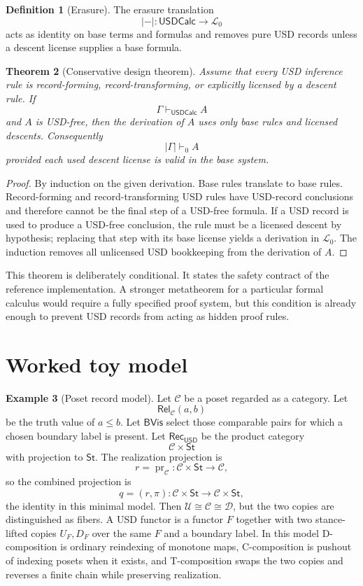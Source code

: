 \documentclass[11pt]{article}
\newcommand{\USD}{\mathsf{USD}}
\newcommand{\RecUSD}{\mathsf{Rec}_{\USD}}
\newcommand{\St}{\mathsf{St}}
\newcommand{\UFib}{\mathcal U}
\newcommand{\DFib}{\mathcal D}
\newcommand{\Rel}{\mathsf{Rel}}
\newcommand{\BVis}{\mathsf{BVis}}
\newcommand{\USDCalc}{\mathsf{USDCalc}}
\theoremstyle{definition}
\newtheorem{definition}{Definition}[section]
\newtheorem{example}[definition]{Example}
\theoremstyle{plain}
\newtheorem{theorem}[definition]{Theorem}
\begin{document}
\begin{definition}[Erasure]
The erasure translation
\[
  |-|:\USDCalc\to\mathcal L_0
\]
acts as identity on base terms and formulas and removes pure USD records
unless a descent license supplies a base formula.
\end{definition}

\begin{theorem}[Conservative design theorem]
Assume that every USD inference rule is record-forming, record-transforming,
or explicitly licensed by a descent rule.  If
\[
  \Gamma\vdash_{\USDCalc} A
\]
and $A$ is USD-free, then the derivation of $A$ uses only base rules and
licensed descents.  Consequently
\[
  |\Gamma|\vdash_0 A
\]
provided each used descent license is valid in the base system.
\end{theorem}

\begin{proof}
By induction on the given derivation.  Base rules translate to base rules.
Record-forming and record-transforming USD rules have USD-record
conclusions and therefore cannot be the final step of a USD-free formula.
If a USD record is used to produce a USD-free conclusion, the rule must be
a licensed descent by hypothesis; replacing that step with its base
license yields a derivation in $\mathcal L_0$.  The induction removes all
unlicensed USD bookkeeping from the derivation of $A$.
\end{proof}

This theorem is deliberately conditional.  It states the safety contract
of the reference implementation.  A stronger metatheorem for a particular
formal calculus would require a fully specified proof system, but this
condition is already enough to prevent USD records from acting as hidden
proof rules.

\section{Worked toy model}

\begin{example}[Poset record model]
Let $\mathcal C$ be a poset regarded as a category.  Let
\[
  \Rel_{\mathcal C}(a,b)
\]
be the truth value of $a\leq b$.  Let $\BVis$ select those comparable
pairs for which a chosen boundary label is present.  Let $\RecUSD$ be the
product category
\[
  \mathcal C\times\St
\]
with projection to $\St$.  The realization projection is
\[
  r=\operatorname{pr}_{\mathcal C}:\mathcal C\times\St\to\mathcal C,
\]
so the combined projection is
\[
  q=(r,\pi):\mathcal C\times\St\to\mathcal C\times\St,
\]
the identity in this minimal model.  Then
$\UFib\cong\mathcal C\cong\DFib$, but the two copies are distinguished as
fibers.  A USD functor is a functor $F$ together with two stance-lifted
copies $U_F,D_F$ over the same $F$ and a boundary label.  In this model
D-composition is ordinary reindexing of monotone maps, C-composition is
pushout of indexing posets when it exists, and T-composition swaps the
two copies and reverses a finite chain while preserving realization.
\end{example}
\end{document}
